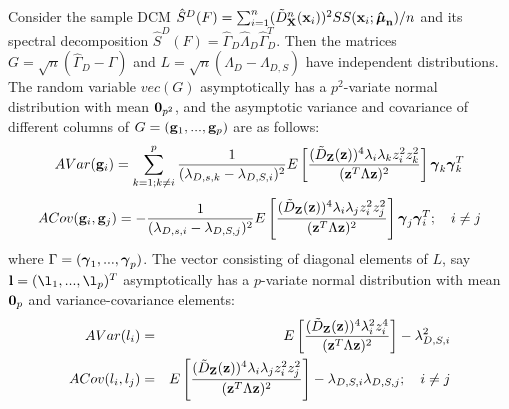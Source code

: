 \begin{Corollary} \label{Corollary:eigendist}
Consider the sample DCM $ \hat S^D(F) = \sum_{i=1}^n (\tilde D^n_{\mathbf{X}} ({\bf{x}}_i))^2 SS({\bf{x}}_i; {\bf \hat{{\boldsymbol{\mu}}}_n})/n $ and its spectral decomposition $\hat S^D(F) = \hat\Gamma_D \hat\Lambda_D \hat\Gamma_D^T $. Then the matrices $G = \sqrt n (\hat\Gamma_D - \Gamma) $ and $L = \sqrt n (\hat\Lambda_D - \Lambda_{D,S}) $ have independent distributions. The random variable $vec(G)$ asymptotically has a $p^2$-variate normal distribution with mean ${\bf 0}_{p^2}$, and the asymptotic variance and covariance of different columns of $G = ({\bf{g}}_1,...,{\bf{g}}_p)$ are as follows:
%
\begin{equation} \label{equation:DevEq}
AVar({\bf{g}}_i) = \sum_{k=1; k \neq i}^p \frac{1}{(\lambda_{D,s,k} - \lambda_{D,S,i})^2} E \left[ \frac{(\tilde D_{\mathbf{Z}} ({\bf{z}}))^4 \lambda_i \lambda_k z_i^2 z_k^2}{({\bf{z}}^T \Lambda {\bf{z}})^2} \right] {\boldsymbol{\gamma}}_k {\boldsymbol{\gamma}}_k^T
\end{equation}
%
\begin{equation}
ACov({\bf{g}}_i, {\bf{g}}_j) = - \frac{1}{(\lambda_{D,s,i} - \lambda_{D,S,j})^2} E \left[ \frac{(\tilde D_{\mathbf{Z}} ({\bf{z}}))^4 \lambda_i \lambda_j z_i^2 z_j^2}{({\bf{z}}^T \Lambda {\bf{z}})^2} \right] {\boldsymbol{\gamma}}_j {\boldsymbol{\gamma}}_i^T; \quad i \neq j
\end{equation}
%
where $\Gamma = ({\boldsymbol{\gamma}}_1,...,{\boldsymbol{\gamma}}_p)$. The vector consisting of diagonal elements of $L$, say $\bfl = (\l_1,...,\l_p)^T$ asymptotically has a $p$-variate normal distribution with mean ${\bf 0}_p$ and variance-covariance elements:
%
\begin{eqnarray}
AVar(l_i) &=& E \left[ \frac{(\tilde D_{\mathbf{Z}} ({\bf{z}}))^4 \lambda_i^2 z_i^4}{({\bf{z}}^T \Lambda {\bf{z}})^2} \right] - \lambda_{D,S,i}^2\\
ACov(l_i, l_j) &=& E \left[ \frac{(\tilde D_{\mathbf{Z}} ({\bf{z}}))^4 \lambda_i \lambda_j z_i^2 z_j^2}{({\bf{z}}^T \Lambda {\bf{z}})^2} \right] - \lambda_{D,S,i} \lambda_{D,S,j}; \quad i \neq j
\end{eqnarray}
%
\end{Corollary}



